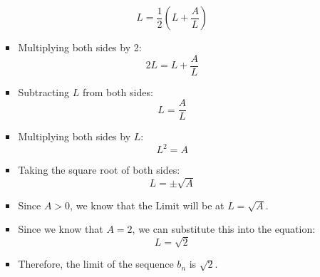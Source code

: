 \documentclass[12pt]{report}
\begin{document}
\begin{enumerate}[leftmargin=\labelsep]
\begin{enumerate}
\begin{tcolorbox}
\begin{itemize}[label={}]
                        \begin{equation*}
                            L=\frac{1}{2}\left(L+\frac{A}{L} \right)
                        \end{equation*}
                        \item Multiplying both sides by 2:
                        \begin{equation*}
                            2L=L+\frac{A}{L}
                        \end{equation*}
                        \item Subtracting $L$ from both sides:
                        \begin{equation*}
                            L=\frac{A}{L}
                        \end{equation*}
                        \item Multiplying both sides by $L$:
                        \begin{equation*}
                            L^2=A
                        \end{equation*}
                        \item Taking the square root of both sides:
                        \begin{equation*}
                            L=\pm \sqrt{A}
                        \end{equation*}
                        \item Since $A>0$, we know that the Limit will be at $L=\sqrt{A}$.
                        \item Since we know that $A=2$, we can substitute this into the equation:
                        \begin{equation*}
                            L=\sqrt{2}
                        \end{equation*}
                        \item Therefore, the limit of the sequence $b_n$ is $\sqrt{2}$.
                    \end{itemize}
                \end{tcolorbox}
        \end{enumerate}

\newpage


\end{enumerate}
\end{document}
